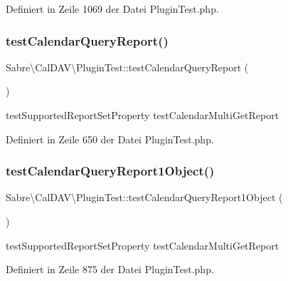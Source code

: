 Definiert in Zeile 1069 der Datei Plugin\+Test.\+php.

\mbox{\label{class_sabre_1_1_cal_d_a_v_1_1_plugin_test_ab5ad85fa986f23f48c05a22bf8272cb1}} 
\subsubsection{\texorpdfstring{test\+Calendar\+Query\+Report()}{testCalendarQueryReport()}}
{\footnotesize\ttfamily Sabre\textbackslash{}\+Cal\+D\+A\+V\textbackslash{}\+Plugin\+Test\+::test\+Calendar\+Query\+Report (\begin{DoxyParamCaption}{ }\end{DoxyParamCaption})}

test\+Supported\+Report\+Set\+Property  test\+Calendar\+Multi\+Get\+Report 

Definiert in Zeile 650 der Datei Plugin\+Test.\+php.

\mbox{\label{class_sabre_1_1_cal_d_a_v_1_1_plugin_test_a7a81f2df564001a052676ef21a8f581f}} 
\subsubsection{\texorpdfstring{test\+Calendar\+Query\+Report1\+Object()}{testCalendarQueryReport1Object()}}
{\footnotesize\ttfamily Sabre\textbackslash{}\+Cal\+D\+A\+V\textbackslash{}\+Plugin\+Test\+::test\+Calendar\+Query\+Report1\+Object (\begin{DoxyParamCaption}{ }\end{DoxyParamCaption})}

test\+Supported\+Report\+Set\+Property  test\+Calendar\+Multi\+Get\+Report 

Definiert in Zeile 875 der Datei Plugin\+Test.\+php.


